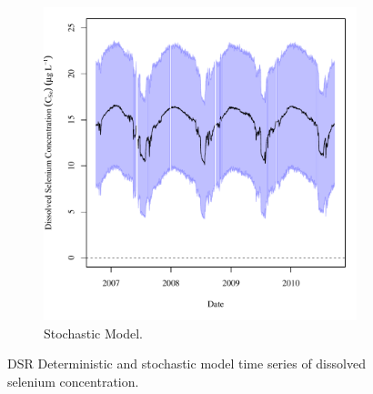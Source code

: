 \begin{landscape}
\begin{figure}
\begin{subfigure}{0.7\textwidth}
			\includegraphics[width=\tableCustomSize]{"Figures/Results_DSR/Stochastic/c TS D106C"}
			\caption{Stochastic Model.}
		\end{subfigure}
		\caption{DSR Deterministic and stochastic model time series of dissolved selenium concentration.}
	\end{figure}
\end{landscape}

